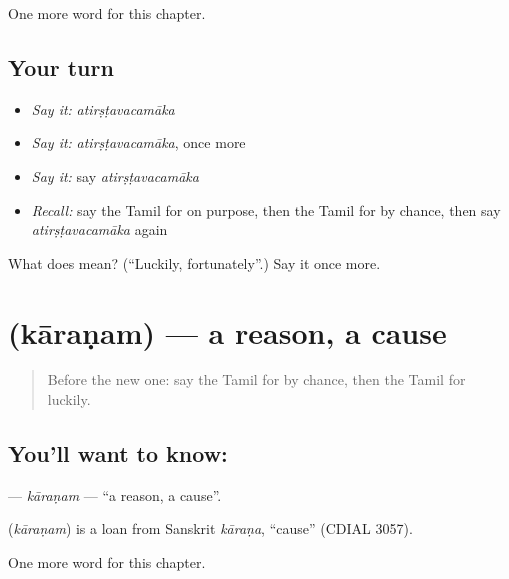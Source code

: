 \begin{grammarlens}[title={What you've built}]
One more word for this chapter.
\end{grammarlens}

\subsection*{Your turn}
\begin{itemize}
\raggedright
  \item \emph{Say it:} \emph{atirṣṭavacamāka}
  \item \emph{Say it:} \emph{atirṣṭavacamāka}, once more
  \item \emph{Say it:} say \emph{atirṣṭavacamāka}
  \item \emph{Recall:} say the Tamil for on purpose, then the Tamil for by chance, then say \emph{atirṣṭavacamāka} again
\end{itemize}

\begin{tcolorbox}[breakable,colback=teal!4,colframe=teal!35!black,title={Before you move on}]
What does  mean? (\textquotedblleft{}Luckily, fortunately\textquotedblright{}.) Say it once more.
\end{tcolorbox}
\section[\texorpdfstring{\ta{காரணம்} (kāraṇam)}{காரணம் (kāraṇam)}]{ (kāraṇam) — a reason, a cause}

\label{lesson:TA-C266-karanam}



\begin{quote}
Before the new one: say the Tamil for by chance, then the Tamil for luckily.
\end{quote}

\subsection*{You'll want to know: }
\textbf{} — \emph{kāraṇam} — \textquotedblleft{}a reason, a cause\textquotedblright{}.

\begin{cousinweb}
\textbf{} (\emph{kāraṇam}) is a loan from Sanskrit \emph{kāraṇa}, \textquotedblleft{}cause\textquotedblright{} (CDIAL 3057).
\end{cousinweb}

\begin{grammarlens}[title={What you've built}]
One more word for this chapter.
\end{grammarlens}

